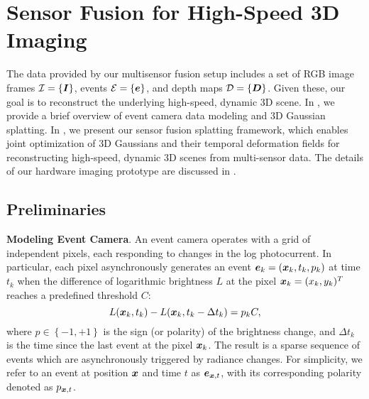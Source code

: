\section{Sensor Fusion for High-Speed 3D Imaging}\feedbackNeeded
\label{method}


The data provided by our multisensor fusion setup includes 
a set of RGB image frames $\mathcal{I}=\{\bm{I}\}$, events $\mathcal{E}=\{\bm{e}\}$, and depth maps $\mathcal{D}=\{\bm{D}\}$.
Given these,
our goal is to reconstruct the underlying high-speed, dynamic 3D scene. 
In \subsectionautorefname{~\ref{preliminary}}, we provide a brief overview of event camera data modeling and 3D Gaussian splatting.
In \subsectionautorefname{~\ref{subsec:event-splatting}}, we present our sensor fusion splatting framework, which enables joint optimization of 3D Gaussians and their temporal deformation fields for reconstructing high-speed, dynamic 3D scenes from multi-sensor data.
The details of our hardware imaging prototype are discussed in \sectionautorefname{~\ref{real_world_exp}}.

\subsection{Preliminaries}
\label{preliminary}

\noindent
\textbf{Modeling Event Camera}. 
An event camera operates with a grid of independent pixels, each responding to changes in the log photocurrent. 
In particular, each pixel asynchronously generates an event $\bm{e}_k = (\bm{x}_k, t_k, p_k)$ at time $t_k$ when the difference of logarithmic brightness $L$ at the pixel $\bm{x}_k = (x_k, y_k)^T$ reaches a predefined threshold $C$:
\begin{equation}
    L(\bm{x}_k, t_k) - L(\bm{x}_k, t_k - \Delta t_k) = p_k C,
\end{equation}
where 
$p\in\left\{- 1, + 1\right\}$ is the sign (or polarity) of the brightness change, and $\Delta t_k$ is the time since the last event at the pixel $\bm{x}_k$. 
The result is a sparse sequence of events which are asynchronously triggered by radiance changes.
For simplicity, we refer to an event at position $\bm{x}$ and time $t$ as $\bm{e}_{\bm{x},t}$, with its corresponding polarity denoted as $p_{\bm{x},t}$. 



